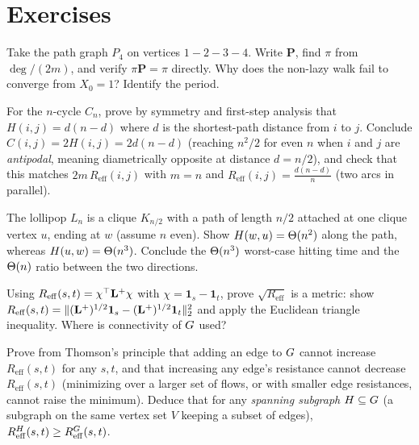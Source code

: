 \section*{Exercises}

\begin{exercise}
Take the path graph $P_4$ on vertices $1\!-\!2\!-\!3\!-\!4$. Write $\mathbf{P}$, find $\pi$ from $\deg/(2m)$, and verify $\pi\mathbf{P}=\pi$ directly. Why does the non-lazy walk fail to converge from $X_0=1$? Identify the period.
\end{exercise}

\begin{exercise}
For the $n$-cycle $C_n$, prove by symmetry and first-step analysis that $H(i,j)=d(n-d)$ where $d$ is the shortest-path distance from $i$ to $j$. Conclude $C(i,j)=2H(i,j)=2d(n-d)$ (reaching $n^2/2$ for even $n$ when $i$ and $j$ are \emph{antipodal}, meaning diametrically opposite at distance $d=n/2$), and check that this matches $2m\,R_{\mathrm{eff}}(i,j)$ with $m=n$ and $R_{\mathrm{eff}}(i,j)=\frac{d(n-d)}{n}$ (two arcs in parallel).
\end{exercise}

\begin{exercise}
The lollipop $L_n$ is a clique $K_{n/2}$ with a path of length $n/2$ attached at one clique vertex $u$, ending at $w$ (assume $n$ even). Show $H(w,u)=\Theta(n^2)$ along the path, whereas $H(u,w)=\Theta(n^3)$. Conclude the $\Theta(n^3)$ worst-case hitting time and the $\Theta(n)$ ratio between the two directions.
\end{exercise}

\begin{exercise}
Using $R_{\mathrm{eff}}(s,t)=\chi^\top\mathbf{L}^+\chi$ with $\chi=\mathbf{1}_s-\mathbf{1}_t$, prove $\sqrt{R_{\mathrm{eff}}}$ is a metric: show $R_{\mathrm{eff}}(s,t)=\lVert(\mathbf{L}^+)^{1/2}\mathbf{1}_s-(\mathbf{L}^+)^{1/2}\mathbf{1}_t\rVert_2^2$ and apply the Euclidean triangle inequality. Where is connectivity of $G$ used?
\end{exercise}

\begin{exercise}
Prove from Thomson's principle that adding an edge to $G$ cannot increase $R_{\mathrm{eff}}(s,t)$ for any $s,t$, and that increasing any edge's resistance cannot decrease $R_{\mathrm{eff}}(s,t)$ (minimizing over a larger set of flows, or with smaller edge resistances, cannot raise the minimum). Deduce that for any \emph{spanning subgraph} $H\subseteq G$ (a subgraph on the same vertex set $V$ keeping a subset of edges), $R^{H}_{\mathrm{eff}}(s,t)\ge R^{G}_{\mathrm{eff}}(s,t)$.
\end{exercise}

